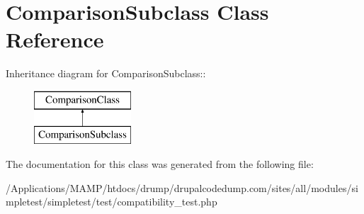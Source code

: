\hypertarget{class_comparison_subclass}{
\section{ComparisonSubclass Class Reference}
\label{class_comparison_subclass}
}
Inheritance diagram for ComparisonSubclass::\begin{figure}[H]
\begin{center}
\leavevmode
\includegraphics[height=2cm]{class_comparison_subclass}
\end{center}
\end{figure}


The documentation for this class was generated from the following file:\begin{DoxyCompactItemize}
\item 
/Applications/MAMP/htdocs/drump/drupalcodedump.com/sites/all/modules/simpletest/simpletest/test/compatibility\_\-test.php\end{DoxyCompactItemize}
